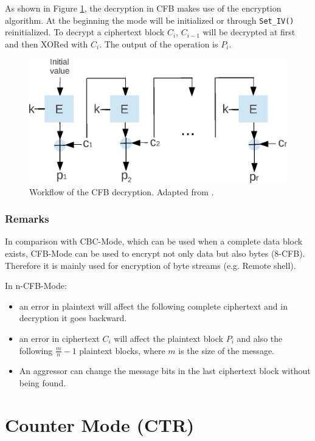 As shown in Figure \ref{CFBDE}, the decryption in CFB makes use of the
encryption algorithm. At the beginning the mode will be initialized or
through \texttt{Set\_IV()} reinitialized. To decrypt a ciphertext
block $C_i$, $C_{i-1}$ will be decrypted at first and then XORed with
$C_i$. The output of the operation is $P_i$.
\begin{figure}[h]
\centering
\includegraphics[scale=0.8]{./images/CFB_De}
\caption{Workflow of the CFB decryption. Adapted from
  \cite{DBLP:reference/crypt/2011}.} \label{CFBDE}
\end{figure}
\subsubsection*{Remarks}
In comparison with CBC-Mode, which can be used when a complete data
block exists, CFB-Mode can be used to encrypt not only data but also
bytes (8-CFB). Therefore it is mainly used for encryption of byte
streams (e.g. Remote shell).

 In n-CFB-Mode:
\begin{itemize}
\item an error in plaintext will affect the following complete
  ciphertext and in decryption it goes backward.
\item an error in ciphertext $C_i$ will affect the plaintext block
  $P_i$ and also the following $\frac{m}{n}-1$ plaintext blocks, where
  $m$ is the size of the message.
\item An aggressor can change the message bits in the last ciphertext
  block without being found.
\end{itemize}


\section{Counter Mode (CTR)}\label{CounterMode}
